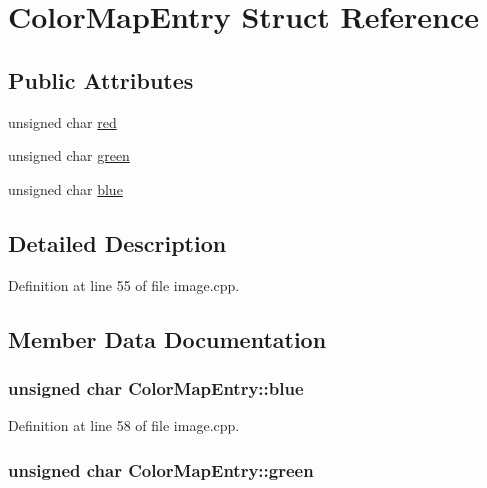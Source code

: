 \hypertarget{structColorMapEntry}{\section{Color\+Map\+Entry Struct Reference}
\label{structColorMapEntry}
}
\subsection*{Public Attributes}
\begin{DoxyCompactItemize}
\item 
unsigned char \hyperlink{structColorMapEntry_a9037199d7c8069a32d4ac0a144091c0e}{red}
\item 
unsigned char \hyperlink{structColorMapEntry_a67039275bc0ec5c1b12ed1688f221f60}{green}
\item 
unsigned char \hyperlink{structColorMapEntry_a3240a8259c24a4ae542b592560d59c69}{blue}
\end{DoxyCompactItemize}


\subsection{Detailed Description}


Definition at line 55 of file image.\+cpp.



\subsection{Member Data Documentation}
\hypertarget{structColorMapEntry_a3240a8259c24a4ae542b592560d59c69}{
\subsubsection[{blue}]{\setlength{\rightskip}{0pt plus 5cm}unsigned char Color\+Map\+Entry\+::blue}}\label{structColorMapEntry_a3240a8259c24a4ae542b592560d59c69}


Definition at line 58 of file image.\+cpp.

\hypertarget{structColorMapEntry_a67039275bc0ec5c1b12ed1688f221f60}{
\subsubsection[{green}]{\setlength{\rightskip}{0pt plus 5cm}unsigned char Color\+Map\+Entry\+::green}}\label{structColorMapEntry_a67039275bc0ec5c1b12ed1688f221f60}


